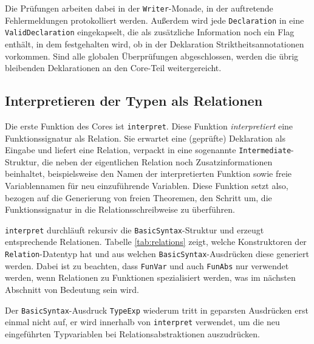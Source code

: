 Die Prüfungen arbeiten dabei in der \texttt{Writer}-Monade, in der auftretende Fehlermeldungen protokolliert werden. Außerdem
wird jede \texttt{Declaration} in eine \texttt{ValidDeclaration} eingekapselt, die als zusätzliche Information noch ein Flag enthält,
in dem festgehalten wird, ob in der Deklaration Striktheitsannotationen vorkommen.
Sind alle globalen Überprüfungen abgeschlossen, werden die übrig bleibenden Deklarationen an den Core-Teil weitergereicht.


\subsection{Interpretieren der Typen als Relationen}

\label{sec:free-theorems-interpret}

Die erste Funktion des Cores ist \texttt{interpret}. Diese Funktion \textit{interpretiert} eine Funktionssignatur als Relation. Sie
erwartet eine (geprüfte) Deklaration als Eingabe und liefert eine Relation, verpackt in eine sogenannte \texttt{Intermediate}-Struktur,
die neben der eigentlichen Relation noch Zusatzinformationen beinhaltet, beispielsweise den Namen der interpretierten Funktion
sowie freie Variablennamen für neu einzuführende Variablen.
Diese Funktion setzt also, bezogen auf die Generierung von freien Theoremen, den Schritt um, die Funktionssignatur in die
Relationsschreibweise zu überführen.

\texttt{interpret} durchläuft rekursiv die \texttt{BasicSyntax}-Struktur und erzeugt entsprechende Relationen.
Tabelle \ref{tab:relations} zeigt, welche Konstruktoren der \texttt{Relation}-Datentyp hat und aus welchen
\texttt{BasicSyntax}-Ausdrücken diese generiert werden. Dabei ist zu beachten, dass
\texttt{FunVar} und auch \texttt{FunAbs} nur verwendet werden, wenn Relationen zu Funktionen spezialisiert werden, was im
nächsten Abschnitt von Bedeutung sein wird.

Der \texttt{BasicSyntax}-Ausdruck \texttt{TypeExp} wiederum tritt in geparsten Ausdrücken erst einmal nicht auf, er wird
innerhalb von \texttt{interpret} verwendet, um die neu eingeführten Typvariablen bei Relationsabstraktionen auszudrücken.

